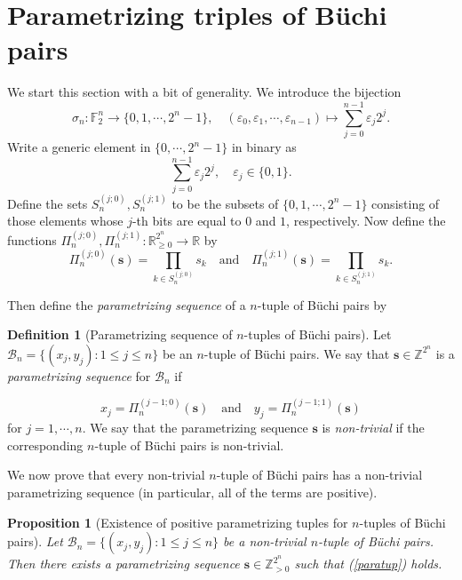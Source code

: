 \documentclass[letterpaper,10pt]{amsart}
\newcommand{\bF}{{\mathbb{F}}}
\newcommand{\bR}{{\mathbb{R}}}
\newcommand{\bZ}{{\mathbb{Z}}}
\newcommand{\Bs}{{\mathbf{s}}}
\newcommand{\B}{{\mathcal{B}}}
\newcommand{\ep}{\varepsilon}
\newtheorem{proposition}[theorem]{Proposition}
\theoremstyle{definition}
\newtheorem{definition}[theorem]{Definition}
\numberwithin{equation}{section}
\begin{document}
	
\section{Parametrizing triples of B\"{u}chi pairs} 
\label{tripsec}

We start this section with a bit of generality. We introduce the bijection 
\begin{equation} \label{sign} \sigma_n : \bF_2^n \rightarrow \{0, 1, \cdots, 2^n - 1\}, \quad (\ep_0, \ep_1, \cdots, \ep_{n-1}) \mapsto \sum_{j=0}^{n-1} \ep_j 2^j. \end{equation}
Write a generic element in $\{0, \cdots, 2^n - 1\}$ in binary as 
\[\sum_{j=0}^{n-1} \ep_j 2^j, \quad \ep_j \in \{0,1\}.\]
Define the sets $S_n^{(j;0)}, S_n^{(j;1)}$ to be the subsets of $\{0, 1, \cdots, 2^n - 1\}$ consisting of those elements whose $j$-th bits are equal to $0$ and $1$, respectively. Now define the functions $\Pi_n^{(j;0)}, \Pi_n^{(j;1)} : \bR_{\geq 0}^{2^n} \rightarrow \bR$ by 
\begin{equation} \Pi_n^{(j; 0)} (\Bs) =  \prod_{k \in S_n^{(j;0)}} s_k \quad \text{and} \quad \Pi_n^{(j;1)}(\Bs) =  \prod_{k \in S_n^{(j;1)}} s_k.
\end{equation}

 Then define the \emph{parametrizing sequence} of a $n$-tuple of B\"{u}chi pairs by 
 
 \begin{definition}[Parametrizing sequence of $n$-tuples of B\"{u}chi pairs] \label{paraseq} Let $\B_n = \{(x_j, y_j) : 1 \leq j \leq n\}$ be an $n$-tuple of B\"{u}chi pairs. We say that $\Bs \in \bZ^{2^n}$ is a \emph{parametrizing sequence} for $\B_n$ if 
 
\begin{equation} \label{paratup} 
x_j = \Pi_{n}^{(j-1;0)}(\Bs) \quad \text{and} \quad y_j = \Pi_{n}^{(j-1;1)} (\Bs)
\end{equation}
for $j = 1, \cdots, n$. We say that the parametrizing sequence $\Bs$ is \emph{non-trivial} if the corresponding $n$-tuple of B\"{u}chi pairs is non-trivial.  \end{definition} 

We now prove that every non-trivial $n$-tuple of B\"{u}chi pairs has a non-trivial parametrizing sequence (in particular, all of the terms are positive). 

\begin{proposition}[Existence of positive parametrizing tuples for $n$-tuples of B\"{u}chi pairs] \label{posseq} Let $\B_n = \{(x_j, y_j) : 1 \leq j \leq n\}$ be a non-trivial $n$-tuple of B\"{u}chi pairs. Then there exists a parametrizing sequence $\Bs \in \bZ_{> 0}^{2^n}$ such that (\ref{paratup}) holds. 
\end{proposition}
\end{document}
